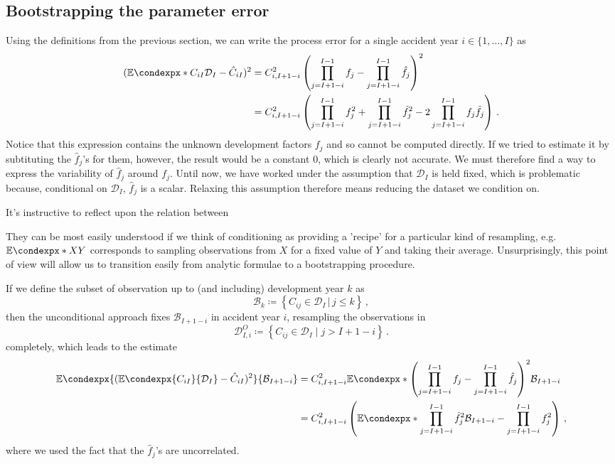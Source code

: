 \documentclass[a4paper]{book}
\theoremstyle{plain}
\newcommand{\condexp}{\mathbb{E}\condexpx}
\begin{document}
\subsection{Bootstrapping the parameter error}

Using the definitions from the previous section, we can write the process error for a single accident year $i \in \{ 1, 
\dots, I \}$ as
\begin{align}
    (\condexp*{C_{iI}}{\mathcal{D}_I} - \hat{C}_{iI})^2 &= C^2_{i, I+1-i} \left( \prod_{j=I+1-i}^{I-1}f_j - \prod_{j=I+1-i}^{I-1}\hat{f}_j \right)^2 \\
    \label{procerr}%
    &= C^2_{i, I+1-i} \left( \prod_{j=I+1-i}^{I-1}f^2_j + \prod_{j=I+1-i}^{I-1}\hat{f}^2_j - 2 \prod_{j=I+1-i}^{I-1}f_j \hat{f}_j \right) \,.
\end{align}
Notice that this expression contains the unknown development factors $f_j$ and so cannot be computed directly. If we tried to estimate it by subtituting the $\hat{f}_j$'s for them, however, the result would be a constant $0$, which is clearly not accurate. We must therefore find a way to express the variability of $\hat{f}_j$ around $f_j$. Until now, we have worked under the assumption that $\mathcal{D}_I$ is held fixed, which is problematic because, conditional on $\mathcal{D}_I$, $\hat{f}_j$ is a scalar. Relaxing this assumption therefore means reducing the dataset we condition on.

It's instructive to reflect upon the relation between 

They can be most easily understood if we think of conditioning as providing a 'recipe' for a particular kind of resampling, e.g. $\condexp*{X}{Y}$ corresponds to sampling observations from $X$ for a fixed value of $Y$ and taking their average. Unsurprisingly, this point of view will allow us to transition easily from analytic formulae to a bootstrapping procedure.

If we define the subset of observation up to (and including) development year $k$ as
\begin{equation}
    \mathcal{B}_k \coloneqq \left\lbrace C_{ij} \in \mathcal{D}_I \, \rvert \, j \leq k \right\rbrace \,,
\end{equation}
then the unconditional approach fixes $\mathcal{B}_{I+1-i}$ in accident year $i$, resampling the observations in
\begin{equation}
    \mathcal{D}^O_{I, i} \coloneqq \left \lbrace C_{ij} \in \mathcal{D}_I \mid j > I + 1 - i \right\rbrace \,.
\end{equation}
completely, which leads to the estimate
\begin{align} \label{eq:unconditional-parameter-error}
    \condexp{(\condexp{C_{iI}}{\mathcal{D}_I} - \hat{C}_{iI})^2}{\mathcal{B}_{I+1-i}} &= C^2_{i, I+1-i} \condexp*{\left( \prod_{j=I+1-i}^{I-1}f_j - \prod_{j=I+1-i}^{I-1}\hat{f}_j \right)^2}{\mathcal{B}_{I+1-i}} \\
    &= C^2_{i, I+1-i} \left( \condexp*{\prod_{j=I+1-i}^{I-1}\hat{f}^2_j}{\mathcal{B}_{I+1-i}} - \prod_{j=I+1-i}^{I-1}f^2_j \right)\,,
\end{align}
where we used the fact that the $\hat{f}_j$'s are uncorrelated.
\end{document}
